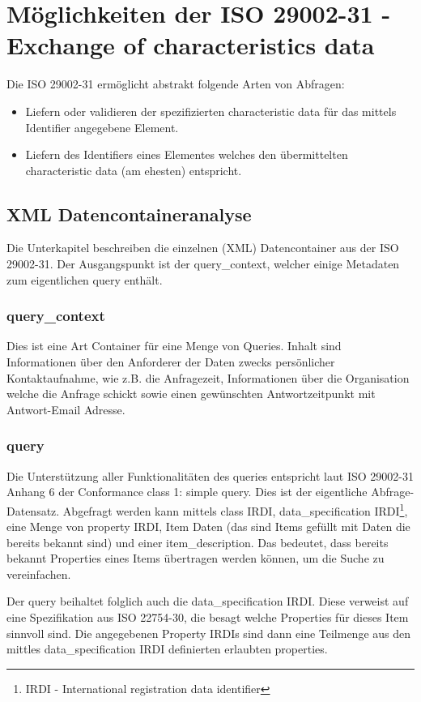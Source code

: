 \chapter{Möglichkeiten der ISO 29002-31 - Exchange of characteristics data}

Die ISO 29002-31 ermöglicht abstrakt folgende Arten von Abfragen:
\begin{itemize}
\item Liefern oder validieren der spezifizierten characteristic data für das mittels Identifier angegebene Element.
\item Liefern des Identifiers eines Elementes welches den übermittelten characteristic data (am ehesten) entspricht. 
\end{itemize}

\section{XML Datencontaineranalyse}
Die Unterkapitel beschreiben die einzelnen (XML) Datencontainer aus der ISO 29002-31. Der Ausgangspunkt ist der query\_context, welcher einige Metadaten zum eigentlichen query enthält. 

\subsection{query\_context}
Dies ist eine Art Container für eine Menge von Queries. Inhalt sind Informationen über den Anforderer der Daten zwecks persönlicher Kontaktaufnahme, wie z.B. die Anfragezeit, Informationen über die Organisation welche die Anfrage schickt sowie einen gewünschten Antwortzeitpunkt mit Antwort-Email Adresse. 


\subsection{query}
Die Unterstützung aller Funktionalitäten des queries entspricht laut ISO 29002-31 Anhang 6 der Conformance class 1: simple query.
Dies ist der eigentliche Abfrage-Datensatz. Abgefragt werden kann mittels class IRDI, data\_specification IRDI\footnote{IRDI  - International registration data identifier}, eine Menge von property IRDI, Item Daten (das sind Items gefüllt mit Daten die bereits bekannt sind) und einer item\_description. Das bedeutet, dass bereits bekannt Properties eines Items übertragen werden können, um die Suche zu vereinfachen.

Der query beihaltet folglich auch die data\_specification IRDI. Diese verweist auf eine Spezifikation aus ISO 22754-30, die besagt welche Properties für dieses Item sinnvoll sind. Die angegebenen Property IRDIs sind dann eine Teilmenge aus den mittles data\_specification IRDI definierten erlaubten properties. 

